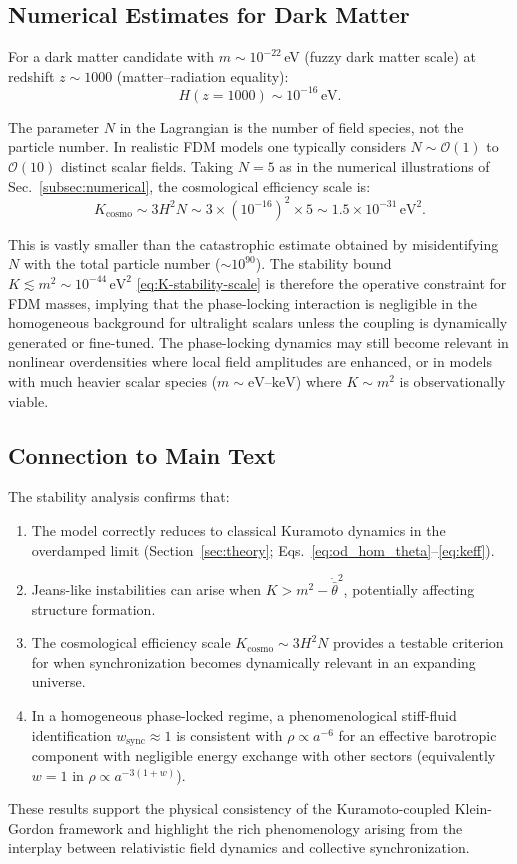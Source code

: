 \subsection{Numerical Estimates for Dark Matter}

For a dark matter candidate with $m \sim 10^{-22}$\,eV (fuzzy dark matter scale) at redshift $z \sim 1000$ (matter--radiation equality):
\begin{equation}
H(z=1000) \sim 10^{-16}\,\mathrm{eV}.
\end{equation}

The parameter $N$ in the Lagrangian is the number of field species, not the particle number.
In realistic FDM models one typically considers $N \sim \mathcal{O}(1)$ to $\mathcal{O}(10)$ distinct scalar fields.
Taking $N=5$ as in the numerical illustrations of Sec.~\ref{subsec:numerical}, the cosmological efficiency scale is:
\begin{equation}
K_{\mathrm{cosmo}} \sim 3 H^2 N \sim 3 \times (10^{-16})^2 \times 5 \sim 1.5 \times 10^{-31}\,\mathrm{eV}^2.
\end{equation}

This is vastly smaller than the catastrophic estimate obtained by misidentifying $N$ with the total particle number ($\sim 10^{90}$).
The stability bound $K\lesssim m^2\sim 10^{-44}\,\mathrm{eV}^2$ \eqref{eq:K-stability-scale} is therefore the operative constraint for FDM masses, implying that the phase-locking interaction is negligible in the homogeneous background for ultralight scalars unless the coupling is dynamically generated or fine-tuned.
The phase-locking dynamics may still become relevant in nonlinear overdensities where local field amplitudes are enhanced, or in models with much heavier scalar species ($m \sim \mathrm{eV}$--$\mathrm{keV}$) where $K\sim m^2$ is observationally viable.

\subsection{Connection to Main Text}

The stability analysis confirms that:
\begin{enumerate}
\item The model correctly reduces to classical Kuramoto dynamics in the overdamped limit (Section~\ref{sec:theory}; Eqs.~\eqref{eq:od_hom_theta}--\eqref{eq:keff}).
\item Jeans-like instabilities can arise when $K > m^2 - \dot{\bar{\theta}}^2$, potentially affecting structure formation.
\item The cosmological efficiency scale $K_{\mathrm{cosmo}} \sim 3H^2N$ provides a testable criterion for when synchronization becomes dynamically relevant in an expanding universe.
\item In a homogeneous phase-locked regime, a phenomenological stiff-fluid identification $w_{\mathrm{sync}}\approx 1$ is consistent with $\rho\propto a^{-6}$ for an effective barotropic component with negligible energy exchange with other sectors (equivalently $w=1$ in $\rho\propto a^{-3(1+w)}$).
\end{enumerate}

These results support the physical consistency of the Kuramoto-coupled Klein-Gordon framework and highlight the rich phenomenology arising from the interplay between relativistic field dynamics and collective synchronization.
